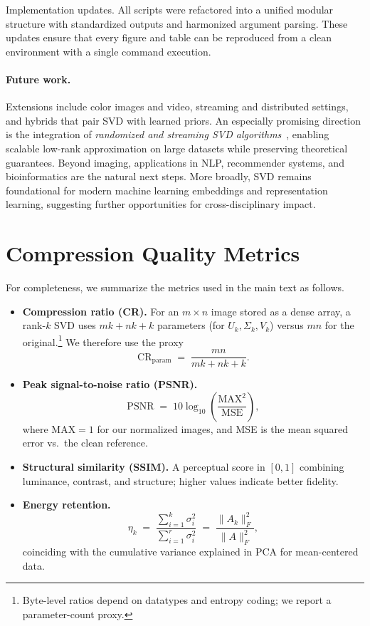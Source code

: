 \documentclass[11pt,a4paper]{article}
\begin{document}
Implementation updates. 
All scripts were refactored into a unified modular structure with standardized outputs and harmonized argument parsing. 
These updates ensure that every figure and table can be reproduced from a clean environment with a single command execution.


\paragraph{Future work.}
Extensions include color images and video, streaming and distributed settings, and hybrids that pair SVD with learned priors. 
An especially promising direction is the integration of \emph{randomized and streaming SVD algorithms}~\cite{halko2011finding}, 
enabling scalable low-rank approximation on large datasets while preserving theoretical guarantees. 
Beyond imaging, applications in NLP, recommender systems, and bioinformatics are the natural next steps. 
More broadly, SVD remains foundational for modern machine learning embeddings and representation learning, 
suggesting further opportunities for cross-disciplinary impact.

\appendix

\section{Compression Quality Metrics}
\label{sec:metrics}

For completeness, we summarize the metrics used in the main text as follows.

\begin{itemize}[leftmargin=1.5em]
    \item \textbf{Compression ratio (CR).}  
    For an \(m\times n\) image stored as a dense array, a rank-\(k\) SVD uses \(mk + nk + k\) parameters (for \(U_k,\Sigma_k,V_k\)) versus \(mn\) for the original.\footnote{Byte-level ratios depend on datatypes and entropy coding; we report a parameter-count proxy.}  
    We therefore use the proxy
    \[
      \mathrm{CR}_{\text{param}} \;=\; \frac{mn}{mk + nk + k}.
    \]
    \item \textbf{Peak signal-to-noise ratio (PSNR).}  
    \[
      \mathrm{PSNR} \;=\; 10 \log_{10}\!\left(\frac{\mathrm{MAX}^2}{\mathrm{MSE}}\right),
    \]
    where \(\mathrm{MAX}=1\) for our normalized images, and MSE is the mean squared error vs.\ the clean reference.
    \item \textbf{Structural similarity (SSIM).}  
    A perceptual score in \([0,1]\) combining luminance, contrast, and structure; higher values indicate better fidelity.
    \item \textbf{Energy retention.}  
    \[
      \eta_k \;=\; \frac{\sum_{i=1}^{k}\sigma_i^2}{\sum_{i=1}^{r}\sigma_i^2}
      \;=\; \frac{\|A_k\|_F^2}{\|A\|_F^2},
    \]
    coinciding with the cumulative variance explained in PCA for mean-centered data.
\end{itemize}
\end{document}
